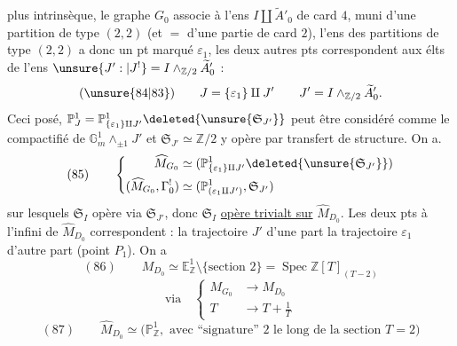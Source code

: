 plus intrinsèque, le graphe $G_0$  associe à l'ens $I\amalg\widetilde A'_0$ de card $4$, muni d'une partition de type $(2,2)$ (et $=$ d'une partie  de card $2$), l'ens  des  partitions de type $(2,2)$ a donc un pt marqué $\varepsilon_1$, les deux autres pts correspondent aux élts de l'ens $\unsure{J':|J^!}=I\wedge_{\mathbb Z/2}\widetilde A'_0$ :
\[
(\unsure{84|83})\qquad J=\{\varepsilon_1\}\amalg J'\qquad J'=I\wedge_{\mathbb Z/2}\widetilde A'_0.
\]
Ceci posé, $\mathbb P^1_J=\mathbb P^1_{\{\varepsilon_1\}\amalg J'}\deleted{\unsure{\mathfrak S_{J'}}}$ peut être considéré comme le compactifié de $\mathbb G_m^{1}\wedge_{\pm1}J'$ et  $\mathfrak S_{J'}\simeq\mathbb Z/2$ y opère par transfert de structure. On a.
\[
(85)\qquad
\left\{\begin{aligned}
\widehat M_{G_0}&\simeq(\mathbb P^1_{\{\varepsilon_1\}\amalg J'}\deleted{\unsure{\mathfrak S_{J'}}})\\
(\widehat M_{G_0},\Gamma^!_0)&\simeq(\mathbb P^1_{(\varepsilon_1\amalg J')},\mathfrak S_{J'})
\end{aligned}\right.
\]
sur lesquels $\mathfrak S_I$ opère via $\mathfrak S_{J'}$, donc $\mathfrak S_I$ \uline{opère trivialt sur} $\widehat M_{D_0}$. Les deux pts à l'infini de $\widehat M_{D_0}$ correspondent : la trajectoire $J'$ d'une part  la trajectoire $\varepsilon_1$ d'autre part (point $P_1$). On a
\[
(86)\qquad M_{D_0}\simeq\mathbb E^1_{\mathbb Z}\setminus\{\text{section }2\}=\operatorname{Spec}\mathbb Z[T]_{(T-2)}
\]
\[
\text{via}\quad\left\{\begin{aligned}M_{G_0}&\longrightarrow M_{D_0}\\ T&\longrightarrow T+\frac1T\end{aligned}\right.
\]
\[
(87)\qquad\widehat M_{D_0}\simeq\bigl(\mathbb P^1_{\mathbb Z},\text{ avec ``signature'' }2\text{ le long de la section }T=2\bigr)
\]
